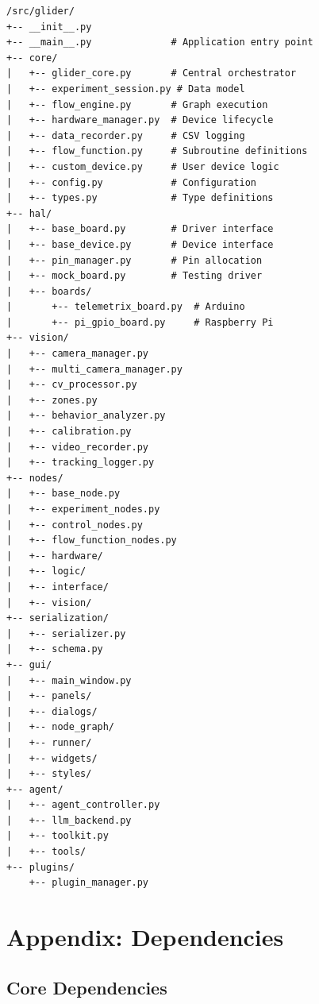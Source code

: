 \documentclass[11pt,a4paper]{article}
\begin{document}
\begin{verbatim}
/src/glider/
+-- __init__.py
+-- __main__.py              # Application entry point
+-- core/
|   +-- glider_core.py       # Central orchestrator
|   +-- experiment_session.py # Data model
|   +-- flow_engine.py       # Graph execution
|   +-- hardware_manager.py  # Device lifecycle
|   +-- data_recorder.py     # CSV logging
|   +-- flow_function.py     # Subroutine definitions
|   +-- custom_device.py     # User device logic
|   +-- config.py            # Configuration
|   +-- types.py             # Type definitions
+-- hal/
|   +-- base_board.py        # Driver interface
|   +-- base_device.py       # Device interface
|   +-- pin_manager.py       # Pin allocation
|   +-- mock_board.py        # Testing driver
|   +-- boards/
|       +-- telemetrix_board.py  # Arduino
|       +-- pi_gpio_board.py     # Raspberry Pi
+-- vision/
|   +-- camera_manager.py
|   +-- multi_camera_manager.py
|   +-- cv_processor.py
|   +-- zones.py
|   +-- behavior_analyzer.py
|   +-- calibration.py
|   +-- video_recorder.py
|   +-- tracking_logger.py
+-- nodes/
|   +-- base_node.py
|   +-- experiment_nodes.py
|   +-- control_nodes.py
|   +-- flow_function_nodes.py
|   +-- hardware/
|   +-- logic/
|   +-- interface/
|   +-- vision/
+-- serialization/
|   +-- serializer.py
|   +-- schema.py
+-- gui/
|   +-- main_window.py
|   +-- panels/
|   +-- dialogs/
|   +-- node_graph/
|   +-- runner/
|   +-- widgets/
|   +-- styles/
+-- agent/
|   +-- agent_controller.py
|   +-- llm_backend.py
|   +-- toolkit.py
|   +-- tools/
+-- plugins/
    +-- plugin_manager.py
\end{verbatim}

\section{Appendix: Dependencies}

\subsection{Core Dependencies}
\end{document}
